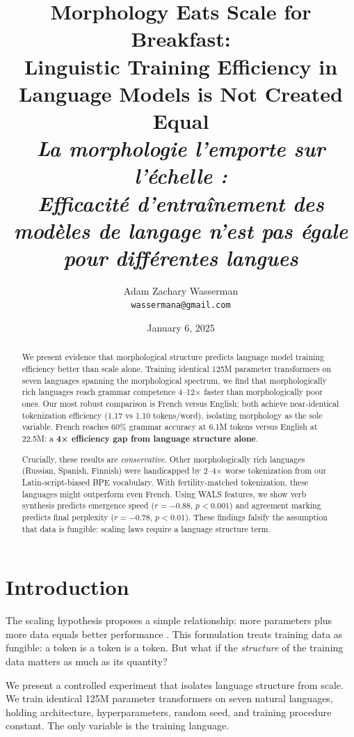 \documentclass[11pt]{article}
\title{\textbf{Morphology Eats Scale for Breakfast:\\Linguistic Training Efficiency in Language Models is Not Created Equal}\\[0.5em]
\large\textit{La morphologie l'emporte sur l'échelle :\\Efficacité d'entraînement des modèles de langage n'est pas égale pour différentes langues}}
\author{
  Adam Zachary Wasserman\\
  \texttt{wassermana@gmail.com}
}
\date{January 6, 2025}
\begin{document}
\maketitle


\begin{abstract}
We present evidence that morphological structure predicts language model training efficiency better than scale alone. Training identical 125M parameter transformers on seven languages spanning the morphological spectrum, we find that morphologically rich languages reach grammar competence 4--12× faster than morphologically poor ones. Our most robust comparison is French versus English: both achieve near-identical tokenization efficiency (1.17 vs 1.10 tokens/word), isolating morphology as the sole variable. French reaches 60\% grammar accuracy at 6.1M tokens versus English at 22.5M: a \textbf{4× efficiency gap from language structure alone}.

Crucially, these results are \textit{conservative}. Other morphologically rich languages (Russian, Spanish, Finnish) were handicapped by 2--4× worse tokenization from our Latin-script-biased BPE vocabulary. With fertility-matched tokenization, these languages might outperform even French. Using WALS features, we show verb synthesis predicts emergence speed ($r=-0.88$, $p<0.001$) and agreement marking predicts final perplexity ($r=-0.78$, $p<0.01$). These findings falsify the assumption that data is fungible: scaling laws require a language structure term.
\end{abstract}

\section{Introduction}

The scaling hypothesis proposes a simple relationship: more parameters plus more data equals better performance \citep{kaplan2020scaling, hoffmann2022training}. This formulation treats training data as fungible: a token is a token is a token. But what if the \textit{structure} of the training data matters as much as its quantity?

We present a controlled experiment that isolates language structure from scale. We train identical 125M parameter transformers on seven natural languages, holding architecture, hyperparameters, random seed, and training procedure constant. The only variable is the training language.
\end{document}
